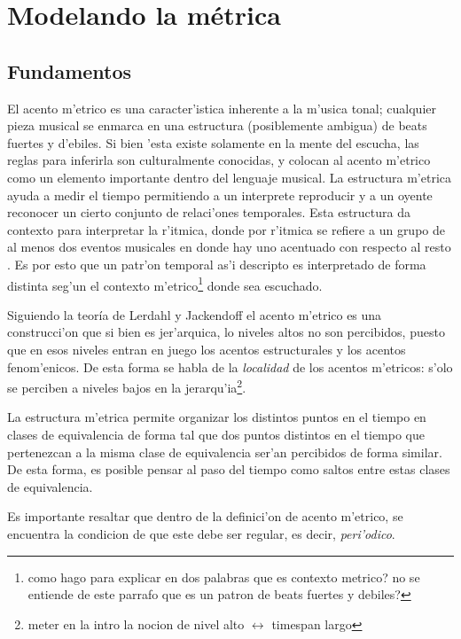\section{Modelando la m\'etrica}
\subsection{Fundamentos}
El acento m'etrico es una caracter'istica inherente a la m'usica tonal; cualquier pieza musical se enmarca en una estructura 
(posiblemente ambigua) de beats fuertes y d'ebiles. Si bien 'esta existe solamente en la mente del escucha, las reglas para inferirla son culturalmente conocidas, 
y colocan al acento m'etrico como un elemento importante dentro del lenguaje musical. La estructura m'etrica ayuda a medir el tiempo permitiendo a un interprete 
reproducir y a un oyente reconocer un cierto conjunto de relaci'ones temporales. Esta estructura da contexto para interpretar la r'itmica,  
donde por r'itmica se refiere a un grupo de al menos dos eventos musicales en donde hay uno acentuado con respecto al resto \cite{CooperMeyer60}.
Es por esto que un patr'on temporal as'i descripto es interpretado de forma distinta seg'un el contexto m'etrico\footnote{como hago para explicar en dos palabras que es contexto metrico? no se entiende de este parrafo que es un patron de beats fuertes y debiles?} donde sea escuchado. 

Siguiendo la teor\'ia de Lerdahl y Jackendoff el acento m'etrico es una construcci'on que si bien es jer'arquica, lo niveles altos no son percibidos, puesto
que en esos niveles entran en juego los acentos estructurales y los acentos fenom'enicos. De esta forma se habla de la \emph{localidad} de los acentos m'etricos: 
s'olo se perciben a niveles bajos en la jerarqu'ia\footnote{meter en la intro la nocion de nivel alto $\leftrightarrow$ timespan largo}. 

La estructura m'etrica permite organizar los distintos puntos en el tiempo en clases de 
equivalencia de forma tal que dos puntos distintos en el tiempo que pertenezcan a la misma clase de equivalencia ser'an percibidos de forma similar\cite{Benjamin84}. 
De esta forma, es posible pensar al paso del tiempo como saltos entre estas clases de equivalencia. 

Es importante resaltar que dentro de la definici'on de acento m'etrico, se encuentra la condicion de que este debe ser regular, es decir, \emph{peri'odico}. 

